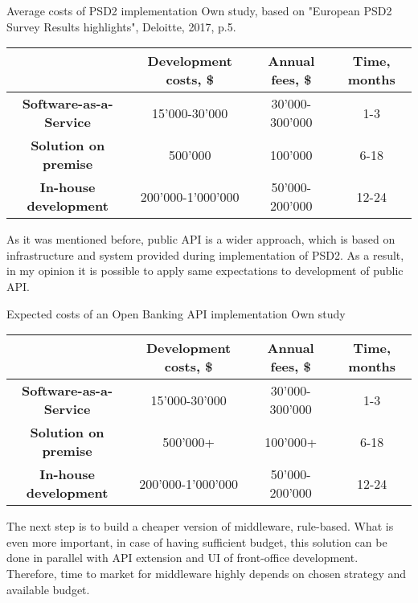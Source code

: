 \mttable
{Average costs of PSD2 implementation}
{Own study, based on "European PSD2 Survey Results highlights", Deloitte, 2017, p.5.}
{
    \begin{tabular}{| c | c | c | c |}
        \hline
        &
        \textbf{Development costs, \$} & 
        \textbf{Annual fees, \$} &
        \textbf{Time, months} \\ \hline 
       
        \textbf{Software-as-a-Service} & 
            15'000-30'000 & 
            30'000-300'000 &
            1-3 \\ \hline 
       
        \textbf{Solution on premise} & 
            500'000 &
            100'000 &
            6-18 \\ \hline 

        \textbf{In-house development} &
            200'000-1'000'000 &
            50'000-200'000 &
            12-24 \\ \hline
    \end{tabular}
}

As it was mentioned before, public API is a wider approach, which is based on infrastructure and system provided during implementation of PSD2.
As a result, in my opinion it is possible to apply same expectations to development of public API.

\mttable
{Expected costs of an Open Banking API implementation}
{Own study}
{
    \begin{tabular}{| c | c | c | c |}
        \hline
        &
        \textbf{Development costs, \$} & 
        \textbf{Annual fees, \$} &
        \textbf{Time, months} \\ \hline 
       
        \textbf{Software-as-a-Service} & 
            15'000-30'000 & 
            30'000-300'000 &
            1-3 \\ \hline 
       
        \textbf{Solution on premise} & 
            500'000+ &
            100'000+ &
            6-18 \\ \hline 
            
        \textbf{In-house development} &
            200'000-1'000'000 &
            50'000-200'000 &
            12-24 \\ \hline
    \end{tabular}
}

The next step is to build a cheaper version of middleware, rule-based.
What is even more important, in case of having sufficient budget, this solution can be done in parallel with API extension and UI of front-office development.
Therefore, time to market for middleware highly depends on chosen strategy and available budget.

